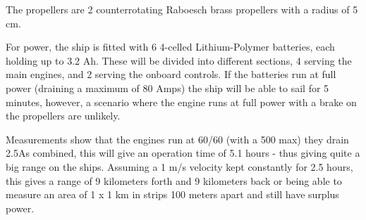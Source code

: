 The propellers are 2 counterrotating Raboesch brass propellers with a radius of 5 cm. 

For power, the ship is fitted with 6 4-celled Lithium-Polymer batteries, each holding up to 3.2 Ah. These will be divided into different sections, 4 serving the main engines, and 2 serving the onboard controls. If the batteries run at full power (draining a maximum of 80 Amps) the ship will be able to sail for 5 minutes, however, a scenario where the engine runs at full power with a brake on the propellers are unlikely.

Measurements show that the engines run at 60/60 (with a 500 max) they drain 2.5As combined, this will give an operation time of 5.1 hours - thus giving quite a big range on the ships. Assuming a 1 m/s velocity kept constantly for 2.5 hours, this gives a range of 9 kilometers forth and 9 kilometers back or being able to measure an area of 1 x 1 km in strips 100 meters apart and still have surplus power.
